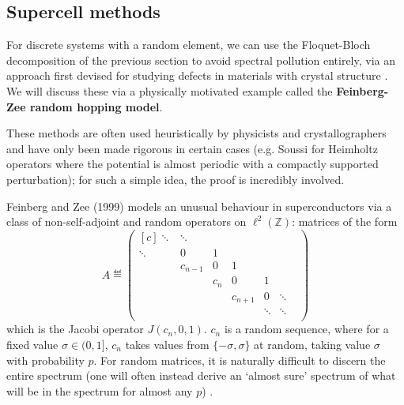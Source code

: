 \documentclass[../main.tex]{subfiles}
\begin{document}
\subsection{Supercell methods} For discrete systems with
a random element, we can use the Floquet-Bloch decomposition of the previous
section to avoid spectral pollution entirely, via an approach first devised for
studying defects in materials with crystal structure
\cite{nieminen2007supercell}. We will discuss these via a physically motivated
example called the \textbf{Feinberg-Zee random hopping model}.

These methods are often used heuristically by physicists and crystallographers
and have only been made rigorous in certain cases (e.g. Soussi
\cite{soussi2006convergence} for Heimholtz operators where the potential is
almost periodic with a compactly supported perturbation); for such a simple
idea, the proof is incredibly involved. 

Feinberg and Zee (1999) \cite{feinberg1999nonhermitian} models an unusual
behaviour in superconductors via a class of non-self-adjoint and random
operators on $\ell^2(\mathbb{Z})$: matrices of the form
  $$ 
  A \eqdef
  \begin{pmatrix*}[c]
    \ddots & \ddots & & & & \\
    \ddots & 0 & 1 & & & \\
    & c_{n-1} & 0 & 1 & & \\
    & & c_{n} & 0 & 1 & \\
    & & & c_{n+1} & 0 & \ddots \\
    & & & & \ddots & \ddots & \\ \end{pmatrix*}
  $$
which is the Jacobi operator $J(c_n, 0, 1)$. $c_n$ is a random sequence, where
for a fixed value $\sigma \in (0, 1]$, $c_n$ takes values from $\{-\sigma,
\sigma\}$ at random, taking value $\sigma$ with probability $p$. For random
matrices, it is naturally difficult to discern the entire spectrum (one will
often instead derive an `almost sure' spectrum of what will be in the spectrum
for almost any $p$) \cite{chandler-wilde2012spectrum}.\\
\end{document}
